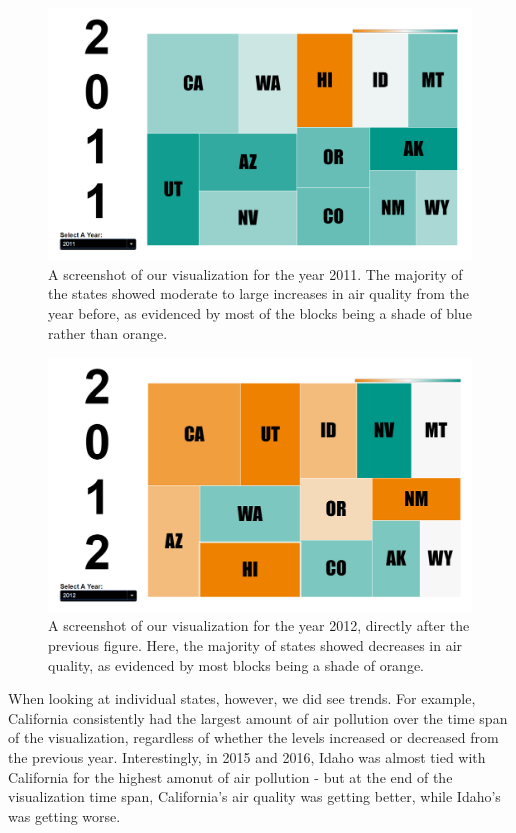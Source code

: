 \documentclass[journal]{vgtc}                %
\begin{document}
\begin{figure}
   \includegraphics[width=\columnwidth]{2011_viz.png}
   \caption{A screenshot of our visualization for the year 2011. The majority of the states showed moderate to large increases
   in air quality from the year before, as evidenced by most of the blocks being a shade of blue rather than orange. \label{fig:2011_viz}}
\end{figure}

\begin{figure}
   \includegraphics[width=\columnwidth]{2012_viz.png}
   \caption{A screenshot of our visualization for the year 2012, directly after the previous figure. Here, the majority of states
   showed decreases in air quality, as evidenced by most blocks being a shade of orange.\label{fig:2012_viz}}
\end{figure}

When looking at individual states, however, we did see trends. For example, California consistently had the largest amount of air
pollution over the time span of the visualization, regardless of whether the levels increased or decreased from the previous year.
Interestingly, in 2015 and 2016, Idaho was almost tied with California for the highest amonut of air pollution - but at the end
of the visualization time span, California's air quality was getting better, while Idaho's was getting worse.
\end{document}
